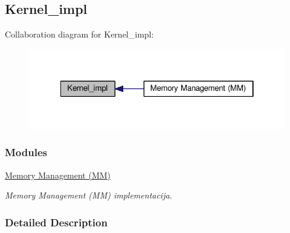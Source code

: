 \hypertarget{group__kernel__impl}{\subsection{Kernel\-\_\-impl}
\label{group__kernel__impl}
}
Collaboration diagram for Kernel\-\_\-impl\-:\nopagebreak
\begin{figure}[H]
\begin{center}
\leavevmode
\includegraphics[width=322pt]{group__kernel__impl}
\end{center}
\end{figure}
\subsubsection*{Modules}
\begin{DoxyCompactItemize}
\item 
\hyperlink{group__mm__impl}{Memory Management (\-M\-M)}
\begin{DoxyCompactList}\small\item\em Memory Management (M\-M) implementacija. \end{DoxyCompactList}\end{DoxyCompactItemize}


\subsubsection{Detailed Description}
